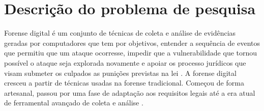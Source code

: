 \documentclass[12pt,				%
	openright,			%
	oneside,			%
	a4paper,			%
	english,			%
	brazil				%
	]{abntex2}
\begin{document}



\textual

\chapter{Descrição do problema de pesquisa} \label{chap:intro}
%
Forense digital é um conjunto de técnicas de coleta e análise de evidências geradas por computadores que tem por objetivos, entender a sequência de eventos que permitiu que um 
ataque ocorresse, impedir que a vulnerabilidade que tornou possível o ataque seja explorada novamente e apoiar os processo jurídicos que visam submeter os culpados as punições
previstas na lei \cite{Sang2013}. 
A forense digital cresceu a partir de técnicas usadas na forense tradicional. Começou de forma artesanal, passou por uma fase de adaptação aos requisitos legais até a era atual
de ferramental avançado de coleta e análise \cite{Charters2008}.
\end{document}
